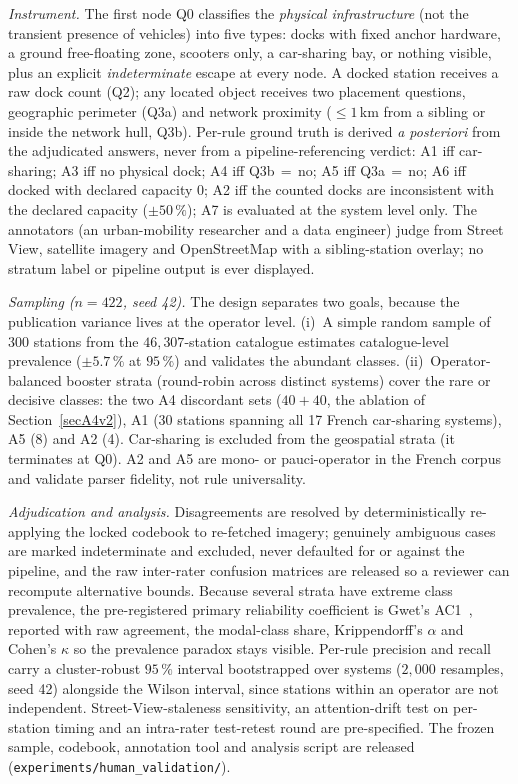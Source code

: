 \documentclass[11pt,a4paper]{article}
\begin{document}
\emph{Instrument.} The first node Q0 classifies the \emph{physical
infrastructure} (not the transient presence of vehicles) into five types:
docks with fixed anchor hardware, a ground free-floating zone, scooters
only, a car-sharing bay, or nothing visible, plus an explicit
\emph{indeterminate} escape at every node. A docked station receives a
raw dock count (Q2); any located object receives two placement questions,
geographic perimeter (Q3a) and network proximity ($\le 1$\,km from a
sibling or inside the network hull, Q3b). Per-rule ground truth is
derived \emph{a posteriori} from the adjudicated answers, never from a
pipeline-referencing verdict: A1 iff car-sharing; A3 iff no physical
dock; A4 iff Q3b\,$=$\,no; A5 iff Q3a\,$=$\,no; A6 iff docked with
declared capacity $0$; A2 iff the counted docks are inconsistent with the
declared capacity ($\pm 50\,\%$); A7 is evaluated at the system level
only. The annotators (an urban-mobility researcher and a data engineer)
judge from Street View, satellite imagery and OpenStreetMap with a
sibling-station overlay; no stratum label or pipeline output is ever
displayed.

\emph{Sampling ($n = 422$, seed 42).} The design separates two goals,
because the publication variance lives at the operator level. (i)~A
simple random sample of 300 stations from the $46{,}307$-station
catalogue estimates catalogue-level prevalence ($\pm 5.7\,\%$ at
$95\,\%$) and validates the abundant classes. (ii)~Operator-balanced
booster strata (round-robin across distinct systems) cover the rare or
decisive classes: the two A4 discordant sets ($40 + 40$, the ablation of
Section~\ref{secA4v2}), A1 (30 stations spanning all 17 French
car-sharing systems), A5 (8) and A2 (4). Car-sharing is excluded from the
geospatial strata (it terminates at Q0). A2 and A5 are mono- or
pauci-operator in the French corpus and validate parser fidelity, not
rule universality.

\emph{Adjudication and analysis.} Disagreements are resolved by
deterministically re-applying the locked codebook to re-fetched imagery;
genuinely ambiguous cases are marked indeterminate and excluded, never
defaulted for or against the pipeline, and the raw inter-rater confusion
matrices are released so a reviewer can recompute alternative bounds.
Because several strata have extreme class prevalence, the pre-registered
primary reliability coefficient is Gwet's AC1~\cite{Gwet2008AC1},
reported with raw agreement, the modal-class share, Krippendorff's
$\alpha$ and Cohen's $\kappa$ so the prevalence paradox stays visible.
Per-rule precision and recall carry a cluster-robust $95\,\%$ interval
bootstrapped over systems ($2{,}000$ resamples, seed 42) alongside the
Wilson interval, since stations within an operator are not independent.
Street-View-staleness sensitivity, an attention-drift test on per-station
timing and an intra-rater test-retest round are pre-specified. The frozen
sample, codebook, annotation tool and analysis script are released
(\texttt{experiments/human\_validation/}).
\end{document}
